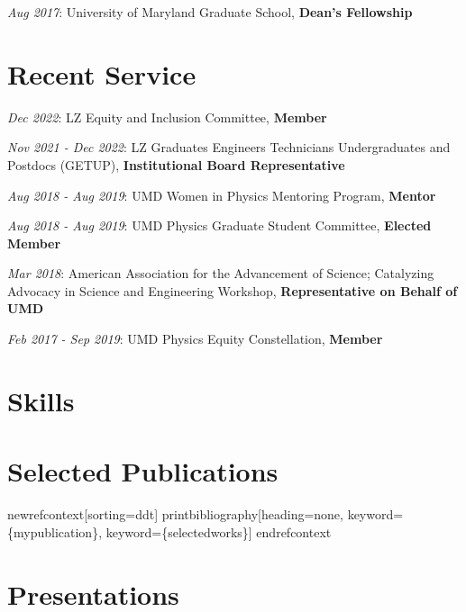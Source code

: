 \documentclass[
  10pt,
  letterpaper,
  DIV=11,
  numbers=noendperiod]{scrartcl}
\begin{document}
\textcolor{mygray}{\textit{Aug 2017}}: University of Maryland Graduate
School, \textbf{Dean's Fellowship}

\hypertarget{fa-people-carry-recent-service}{%
\section{\texorpdfstring{ Recent
Service}{ Recent Service}}\label{fa-people-carry-recent-service}}

\textcolor{mygray}{\textit{Dec 2022}}: LZ Equity and Inclusion
Committee, \textbf{Member}

\textcolor{mygray}{\textit{Nov 2021 - Dec 2022}}: LZ Graduates Engineers
Technicians Undergraduates and Postdocs (GETUP), \textbf{Institutional
Board Representative}

\textcolor{mygray}{\textit{Aug 2018 - Aug 2019}}: UMD Women in Physics
Mentoring Program, \textbf{Mentor}

\textcolor{mygray}{\textit{Aug 2018 - Aug 2019}}: UMD Physics Graduate
Student Committee, \textbf{Elected Member}

\textcolor{mygray}{\textit{Mar 2018}}: American Association for the
Advancement of Science; Catalyzing Advocacy in Science and Engineering
Workshop, \textbf{Representative on Behalf of UMD}

\textcolor{mygray}{\textit{Feb 2017 - Sep 2019}}: UMD Physics Equity
Constellation, \textbf{Member}

\hypertarget{fa-tools-skills}{%
\section{\texorpdfstring{
Skills}{ Skills}}\label{fa-tools-skills}}

\hypertarget{fa-pen-nib-selected-publications}{%
\section{\texorpdfstring{ Selected
Publications}{ Selected Publications}}\label{fa-pen-nib-selected-publications}}

newrefcontext{[}sorting=ddt{]} printbibliography{[}heading=none,
keyword=\{mypublication\}, keyword=\{selectedworks\}{]} endrefcontext

\hypertarget{fa-chart-bar-presentations}{%
\section{\texorpdfstring{
Presentations}{ Presentations}}\label{fa-chart-bar-presentations}}
\end{document}
